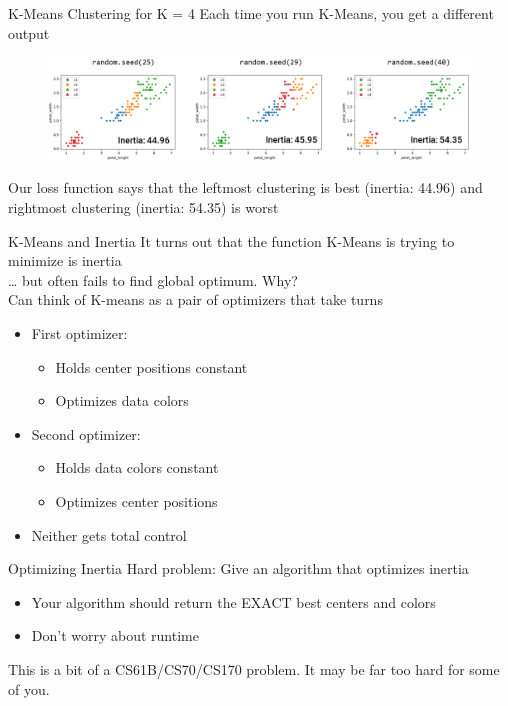 \documentclass[aspectratio=169]{../latex_main/tntbeamer}  %
\begin{document}
	
	
	\begin{frame}{K-Means Clustering for K = 4}
	    Each time you run K-Means, you get a different output
	    \begin{figure}
	        \centering
	        \includegraphics[scale=.4]{Bild24}
	    \end{figure}
	   Our loss function says that the leftmost clustering is best (inertia: 44.96) and rightmost clustering (inertia: 54.35) is worst

	\end{frame}
	
	
	\begin{frame}{K-Means and Inertia}
	    It turns out that the function K-Means is trying to minimize is inertia\\
… but often fails to find global optimum. Why?\\
Can think of K-means as a pair of optimizers that take turns
    \begin{itemize}
        \item First optimizer:
        \begin{itemize}
            \item Holds center positions constant
            \item Optimizes data colors
        \end{itemize}
        \item Second optimizer:
        \begin{itemize}
            \item Holds data colors constant
            \item Optimizes center positions
        \end{itemize}
        \item Neither gets total control 
    \end{itemize}
	\end{frame}
	
	
	
	\begin{frame}{Optimizing Inertia}
	    Hard problem: Give an algorithm that optimizes inertia
	    \begin{itemize}
	        \item Your algorithm should return the EXACT best centers and colors
	        \item Don’t worry about runtime
	    \end{itemize}
	    This is a bit of a CS61B/CS70/CS170 problem. It may be far too hard for some of you.
	\end{frame}
	
\end{document}
